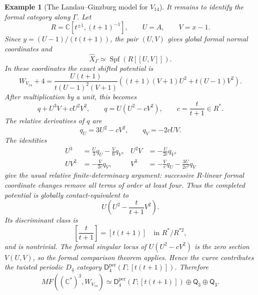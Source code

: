 \documentclass[11pt]{amsart}
\newtheorem{example}{Example}[section]
\newcommand{\MorseCat}[1]{\mathsf{Q}_{#1}}
\newcommand{\Dfourcat}[2]{\mathsf{D}^{\mathrm{per}}_{4}(#1;[#2])}
\begin{document}
\begin{example}[The Landau--Ginzburg model for $V_{14}$]
It remains to identify the formal category along $\Gamma$. Let
\[
R=\mathbb C[t^{\pm1},(t+1)^{-1}],
\qquad
U=A,
\qquad
V=x-1.
\]
Since $y=(U-1)/(t(t+1))$, the pair $(U,V)$ gives global formal normal
coordinates and
\[
\widehat X_\Gamma\simeq\operatorname{Spf}(R[[U,V]]).
\]
In these coordinates the exact shifted potential is
\[
W_{V_{14}}+4
=
\frac{U(t+1)}{t(U-1)^2(V+1)}
\left((t+1)(V+1)U^2+t(U-1)V^2\right).
\]
After multiplication by a unit, this becomes
\[
q+U^3V+cU^2V^2,
\qquad
q=U(U^2-cV^2),
\qquad
c=\frac{t}{t+1}\in R^*.
\]
The relative derivatives of $q$ are
\[
q_U=3U^2-cV^2,
\qquad
q_V=-2cUV.
\]
The identities
\[
\begin{aligned}
U^3&=\frac U3q_U-\frac V6q_V,
&U^2V&=-\frac{U}{2c}q_V,\\
UV^2&=-\frac{V}{2c}q_V,
&V^3&=-\frac Vc q_U-\frac{3U}{2c^2}q_V
\end{aligned}
\]
give the usual relative finite-determinacy argument: successive
$R$-linear formal coordinate changes remove all terms of order at least four.
Thus the completed potential is globally contact-equivalent to
\[
U\left(U^2-\frac{t}{t+1}V^2\right).
\]
Its discriminant class is
\[
\left[\frac{t}{t+1}\right]=[t(t+1)]
\quad\text{in }R^*/R^{*2},
\]
and is nontrivial. The formal singular locus of
$U(U^2-cV^2)$ is the zero section $V(U,V)$, so the formal comparison theorem
applies. Hence the curve contributes the twisted periodic
$D_4$ category $\Dfourcat{\Gamma}{t(t+1)}$. Therefore
\[
\overline{MF((\mathbb C^*)^3,W_{V_{14}})}
\simeq
\Dfourcat{\Gamma}{t(t+1)}
\oplus\MorseCat{3}\oplus\MorseCat{3}.
\]
\end{example}
\end{document}
